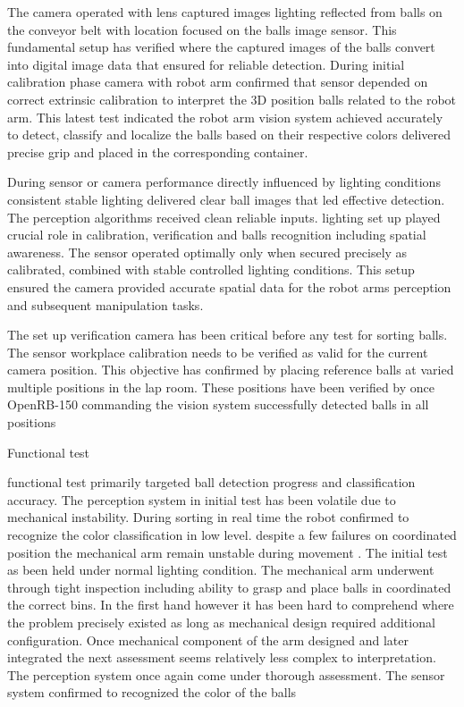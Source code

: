 The camera operated with lens captured images lighting reflected from balls on the conveyor belt with location focused on the balls image sensor. This fundamental setup has verified where the captured images of the balls convert into digital image data that ensured for reliable detection. During initial calibration phase camera with robot arm confirmed that sensor depended on correct extrinsic calibration to interpret the 3D position balls related to the robot arm. This latest test indicated the robot arm vision system achieved accurately to detect, classify and localize the balls based on their respective colors delivered precise grip and placed in the corresponding container. 



During sensor or camera performance directly influenced by lighting conditions consistent stable lighting delivered clear ball images that led effective detection. The perception algorithms received clean reliable inputs. lighting set up played crucial role in calibration, verification and balls recognition including spatial awareness. The sensor operated optimally only when secured precisely as calibrated, combined with stable controlled lighting conditions. This setup ensured the camera provided accurate spatial data for the robot arms perception and subsequent manipulation tasks.



 The set up verification camera  has been critical before any test for sorting balls. The sensor workplace calibration needs to be verified as valid for the current camera position. This objective has confirmed by placing reference balls at varied multiple positions in the lap room. These positions have been verified by once OpenRB-150 commanding the vision system successfully detected balls in all positions

 
Functional test

functional test primarily targeted ball detection progress and classification accuracy. The perception system in initial test has been volatile due to mechanical instability. During sorting in real time the robot confirmed to recognize the color classification in low level. despite a few failures on coordinated position the mechanical arm remain unstable during movement . The initial test as been held under normal lighting condition. The mechanical arm underwent through tight inspection including ability to grasp and place balls in coordinated the correct bins. In the first hand however it has been hard to comprehend where the problem precisely  existed as long as mechanical design required additional configuration. Once mechanical component of the arm designed and later integrated the next assessment seems relatively less complex to interpretation. The perception system once  again come under thorough assessment. The sensor system confirmed to recognized the color of the balls

